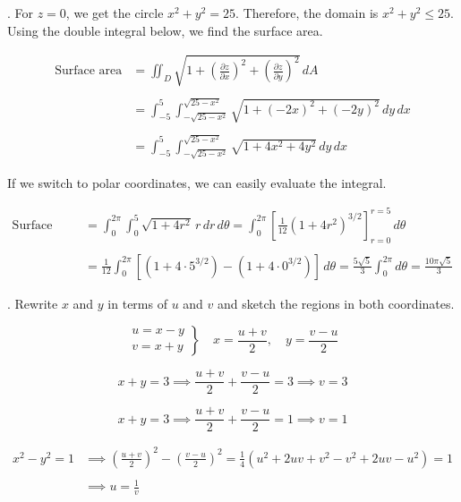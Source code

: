 \documentclass{article}
\begin{document}
\newpage

. For $z=0$, we get the circle $x^2+y^2=25$. Therefore, the domain is $x^2+y^2\leq25$. Using the double integral below, we find the surface area.

\begin{align*}
\text{Surface area}&=\iint_D\sqrt{1+\left(\frac{\partial z}{\partial x}\right)^2 +\left(\frac{\partial z}{\partial y}\right)^2}\,dA\\\\&=\int_{-5}^5\int_{-\sqrt{25-x^2}}^{\sqrt{25-x^2}}\sqrt{1+\left(-2x\right)^2 +\left(-2y\right)^2}\,dy\,dx\\\\&=\int_{-5}^5\int_{-\sqrt{25-x^2}}^{\sqrt{25-x^2}}\sqrt{1+4x^2+4y^2}\,dy\,dx
\end{align*}

\hfill

\noindent If we switch to polar coordinates, we can easily evaluate the integral.

\begin{align*}\text{Surface area}&=\int_0^{2\pi}\int_0^5\sqrt{1+4r^2}\,r\,dr\,d\theta=\int_0^{2\pi}\left[\frac1{12}\left(1+4r^2\right)^{3/2}\right]_{r=0}^{r=5}\,d\theta\\\\&=\frac1{12}\int_0^{2\pi}\left[\left(1+4\cdot5^{3/2}\right)-\left(1+4\cdot0^{3/2}\right)\right]\,d\theta=\frac{5\sqrt5}3\int_0^{2\pi}d\theta=\boxed{\frac{10\pi\sqrt5}3}\end{align*}

\hfill

. Rewrite $x$ and $y$ in terms of $u$ and $v$ and sketch the regions in both coordinates.

\[
\left.
\begin{array}{c}
u=x-y\\v=x+y
\end{array}\right\}
\quad \displaystyle x=\frac{u+v}2,\quad y=\frac{v-u}2
\]

\[x+y=3\implies\frac{u+v}2+\frac{v-u}2=3\implies v=3\]

\[x+y=3\implies\frac{u+v}2+\frac{v-u}2=1\implies v=1\]

\begin{align*}x^2-y^2=1&\implies\left(\frac{u+v}2\right)^2-\left(\frac{v-u}2\right)^2=\frac14\left(u^2+2uv+v^2-v^2+2uv-u^2\right)=1\\\\&\implies u=\frac1v\end{align*}
\end{document}
